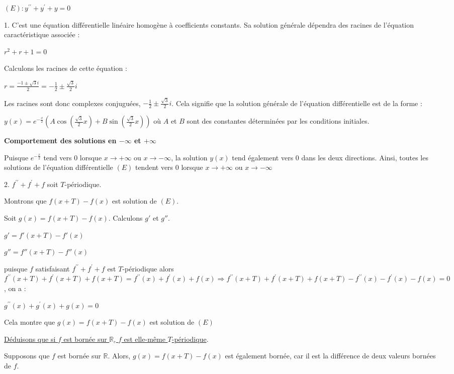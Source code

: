 \documentclass[12pt]{article}
\begin{document}
\begin{spacing}{1.5}
$(E): y^{\prime\prime}+y^{\prime}+y=0$

1. C'est une équation différentielle linéaire homogène à coefficients constants. Sa solution générale dépendra des racines de l'équation caractéristique associée :

$r^2+r+1=0$

Calculons les racines de cette équation :

$r=\frac{-1\pm \sqrt{3}i}{2}=-\frac{1}{2}\pm \frac{\sqrt{3}}{2}i$

Les racines sont donc complexes conjuguées, $-\frac{1}{2}\pm \frac{\sqrt{3}}{2}i$. Cela signifie que la solution générale de l'équation différentielle est de la forme :

$y(x)=e^{-\frac{x}{2}}(A\cos(\frac{\sqrt{3}}{2}x)+B\sin(\frac{\sqrt{3}}{2}x))$ où $A$ et $B$ sont des constantes déterminées par les conditions initiales.

\medskip\textbf{Comportement des solutions en $-\infty$ et $+\infty$}

Puisque $e^{-\frac{x}{2}}$ tend vers 0 lorsque $x\longrightarrow +\infty$ ou $x\longrightarrow -\infty$, la solution $y(x)$  tend également vers 0 dans les deux directions. Ainsi, toutes les solutions de l'équation différentielle $(E)$ tendent vers 0 lorsque $x\longrightarrow +\infty$ ou $x\longrightarrow -\infty$

2. $f^{\prime\prime}+f^{\prime}+f$ soit $T$-périodique. 

Montrons que $f(x +T)-f(x)$ est solution de $(E)$.

Soit $g(x)=f(x +T)-f(x)$. Calculons $g'$ et $g''$.

$g'= f'(x +T)-f'(x)$

$g''=f''(x +T)-f''(x)$

puisque $f$ satisfaisant $f^{\prime\prime}+f^{\prime}+f$ est  $T$-périodique alors $f^{\prime\prime}(x+T)+f^{\prime}(x+T)+f(x+T)=f^{\prime\prime}(x)+f^{\prime}(x)+f(x)\Rightarrow f^{\prime\prime}(x+T)+f^{\prime}(x+T)+f(x+T)-f^{\prime\prime}(x)-f^{\prime}(x)-f(x)=0$, on a :

$g^{\prime\prime}(x)+g^{\prime}(x)+g(x)=0$

Cela montre que $g(x)=f(x+T)-f(x)$ est solution de $(E)$

\medskip \underline{Déduisons que si $f$ est bornée sur $\mathbb{R}$, $f$ est elle-même $T$-périodique}.

Supposons que $f$ est bornée sur $\mathbb{R}$. Alors, $g(x)=f(x+T)-f(x)$ est également bornée, car il est la différence de deux valeurs bornées de $f$.


\end{spacing}
\end{document}
